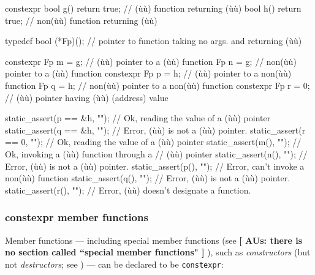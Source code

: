 \begin{emcppslisting}
constexpr bool g() { return true; }  //    (ù{}ù) function returning (ù{}ù)
          bool h() { return true; }  // non(ù{}ù) function returning (ù{}ù)

typedef bool (*Fp)();  // pointer to function taking no args. and returning (ù{}ù)

constexpr Fp m = g;  //    (ù{}ù) pointer to a    (ù{}ù) function
          Fp n = g;  // non(ù{}ù) pointer to a    (ù{}ù) function
constexpr Fp p = h;  //    (ù{}ù) pointer to a non(ù{}ù) function
          Fp q = h;  // non(ù{}ù) pointer to a non(ù{}ù) function
constexpr Fp r = 0;  //    (ù{}ù) pointer having (ù{}ù) (address) value

static_assert(p == &h, "");  // Ok, reading the value of a (ù{}ù) pointer
static_assert(q == &h, "");  // Error, (ù{}ù) is not a (ù{}ù) pointer.
static_assert(r == 0,  "");  // Ok, reading the value of a (ù{}ù) pointer
static_assert(m(), "");      // Ok, invoking a (ù{}ù) function through a
                             //     (ù{}ù) pointer
static_assert(n(), "");      // Error, (ù{}ù) is not a (ù{}ù) pointer.
static_assert(p(), "");      // Error, can't invoke a non(ù{}ù) function
static_assert(q(), "");      // Error, (ù{}ù) is not a (ù{}ù) pointer.
static_assert(r(), "");      // Error, (ù{}ù) doesn't designate a function.
\end{emcppslisting}


\subsubsection[\lstinline!constexpr! member functions]{{\SubsubsecCode constexpr} member functions}\label{constexpr-member-functions}

Member functions --- including special member functions (see
\intrarefsimple{}\textbf{[ AUs: there is no section called ``special member functions" ] }), such as
\emph{constructors} (but not \emph{destructors}; see ) --- can be declared to be
\lstinline!constexpr!:

